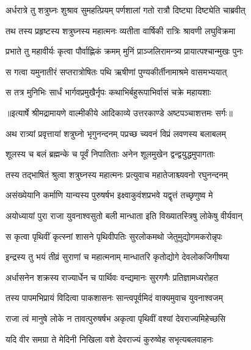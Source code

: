 \twolineshloka
{अर्धरात्रे तु शत्रुघ्नः शुश्राव सुमहत्प्रियम्}
{पर्णशालां गतो रात्रौ दिष्ट्या दिष्ट्येति चाब्रवीत्} %

\twolineshloka
{तथ तस्य प्रहृष्टस्य शत्रुघ्नस्य महात्मनः}
{व्यतीता वार्षिकी रात्रिः श्रावणी लघुविक्रमा} %

\twolineshloka
{प्रभाते तु महावीर्यः कृत्वा पौर्वाह्णिकं क्रमम्}
{मुनिं प्राञ्जलिरामन्त्र्य प्रायात्पश्चान्मुखः पुनः} %

\twolineshloka
{स गत्वा यमुनातीरं सप्तरात्रोषितः पथि}
{ऋषीणां पुण्यकीर्तीनामाश्रमे वासमभ्ययात्} %

\twolineshloka
{स तत्र मुनिभिः सार्धं भार्गवप्रमुखैर्नृपः}
{कथाभिर्बहुरूपाभिर्वासं चक्रे महायशाः} %


{॥इत्यार्षे श्रीमद्रामायणे वाल्मीकीये आदिकाव्ये उत्तरकाण्डे अष्टपञ्चाशत्तमः सर्गः॥}


\twolineshloka
{अथ रात्र्यां प्रवृत्तायां शत्रुघ्नो भृगुनन्दनम्}
{पप्रच्छ च्यवनं विप्रं लवणस्य बलाबलम्} %

\twolineshloka
{शूलस्य च बलं ब्रह्मन्के च पूर्वं निपातिताः}
{अनेन शूलमुखेन द्वन्द्वयुद्धमुपागताः} %

\twolineshloka
{तस्य तद्भाषितं श्रुत्वा शत्रुघ्नस्य महात्मनः}
{प्रत्युवाच महातेजाश्च्यवनो रघुनन्दनम्} %

\twolineshloka
{असंख्येयानि कर्माणि यान्यस्य पुरुषर्षभ}
{इक्ष्वाकुवंशप्रभवे यद्वृत्तं तच्छृणुष्व मे} %

\twolineshloka
{अयोध्यायां पुरा राजा युवनाश्वसुतो बली}
{मान्धाता इति विख्यातस्त्रिषु लोकेषु वीर्यवान्} %

\twolineshloka
{स कृत्वा पृथिवीं कृत्स्नां शासने पृथिवीपतिः}
{सुरलोकमथो जेतुमुद्योगमकरोन्नृपः} %

\twolineshloka
{इन्द्रस्य तु भयं तीव्रं सुराणां च महात्मनाम्}
{मान्धातरि कृतोद्योगे देवलोकजिगीषया} %

\twolineshloka
{अर्धासनेन शक्रस्य राज्यार्धेन च पार्थिवः}
{वन्द्यमानः सुरगणैः प्रतिज्ञामध्यरोहत} %

\twolineshloka
{तस्य पापमभिप्रायं विदित्वा पाकशासनः}
{सान्त्वपूर्वमिदं वाक्यमुवाच युवनाश्वजम्} %

\twolineshloka
{राजा त्वं मानुषे लोके न तावत्पुरुषर्षभ}
{अकृत्वा पृथिवीं वश्यां देवराज्यमिहेच्छसि} %

\twolineshloka
{यदि वीर समग्रा ते मेदिनी निखिला वशे}
{देवराज्यं कुरुष्वेह सभृत्यबलवाहनः} %

